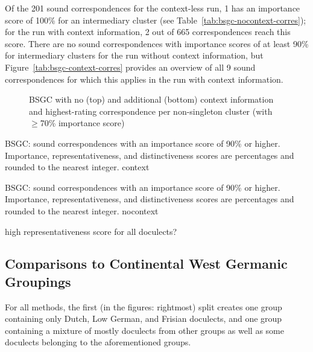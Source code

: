 \documentclass[a4paper]{article}
\begin{document}
Of the 201 sound correspondences for the context-less run,
1 has an importance score of 100\% for an intermediary cluster
(see Table~\ref{tab:bsgc-nocontext-corres});
for the run with context information, 2 out of 665 correspondences reach this score.
There are no sound correspondences with importance scores of at least 90\%
for intermediary clusters for the run without context information,
but Figure~\ref{tab:bsgc-context-corres} provides an overview of
all 9 sound correspondences for which this applies
in the run with context information.

\begin{figure}[h]
  \centering
%   
  

  \vspace{2em}
  
%   
  
  \caption{BSGC with no (top) and additional (bottom) context information and highest-rating correspondence per non-singleton cluster (with $\geq$70\% importance score)}
  \label{fig:bsgc-trees}
\end{figure}


\begin{table}[h]
\centering

\caption{BSGC: sound correspondences with an importance score of 90\% or higher.
Importance, representativeness, and distinctiveness scores are percentages and rounded to the nearest integer.
context}
\label{tab:bsgc-context-corres}
\end{table}

\begin{table}[h]
\centering

\caption{BSGC: sound correspondences with an importance score of 90\% or higher.
Importance, representativeness, and distinctiveness scores are percentages and rounded to the nearest integer.
nocontext}
\label{tab:bsgc-nocontext-corres}
\end{table}

high representativeness score for all doculects?

\subsection{Comparisons to Continental West Germanic Groupings}

For all methods, the first (in the figures: rightmost) split
creates one group containing only Dutch, Low German, and Frisian doculects,
and one group containing a mixture of mostly doculects from other groups
as well as some doculects belonging to the aforementioned groups.
\end{document}
